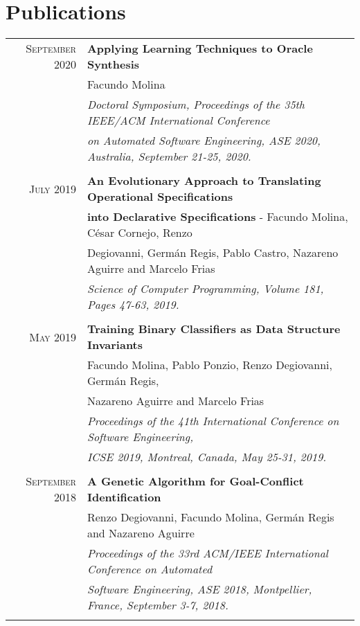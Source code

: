 \documentclass[a4paper,10pt]{article} %
\begin{document}
\section{Publications}
\begin{longtable}{rl}

\textsc{September} 2020  & \textbf{Applying Learning Techniques to Oracle Synthesis} \\
& Facundo Molina \\
& \textit{Doctoral Symposium, Proceedings of the 35th IEEE/ACM International Conference} \\
& \textit{on Automated Software Engineering, ASE 2020, Australia, September 21-25, 2020.} \\ & \\

\textsc{July} 2019  & \textbf{An Evolutionary Approach to Translating Operational Specifications} \\ & \textbf{into Declarative Specifications} - Facundo Molina, César Cornejo, Renzo\\ 
& Degiovanni, Germán Regis, Pablo Castro, Nazareno Aguirre and Marcelo Frias \\
& \textit{Science of Computer Programming, Volume 181, Pages 47-63, 2019.} \\ & \\

\textsc{May} 2019  & \textbf{Training Binary Classifiers as Data Structure Invariants} \\ 
& Facundo Molina, Pablo Ponzio, Renzo Degiovanni, Germán Regis, \\ 
& Nazareno Aguirre and Marcelo Frias \\
& \textit{Proceedings of the 41th International Conference on Software Engineering,} \\
& \textit{ICSE 2019, Montreal, Canada, May 25-31, 2019.} \\ & \\

\textsc{September} 2018  & \textbf{A Genetic Algorithm for Goal-Conflict Identification} \\ 
& Renzo Degiovanni, Facundo Molina, Germán Regis and Nazareno Aguirre \\
& \textit{Proceedings of the 33rd ACM/IEEE International Conference on Automated } \\
& \textit{Software Engineering, ASE 2018, Montpellier, France, September 3-7, 2018.} \\ & \\


\end{longtable}
\end{document}
